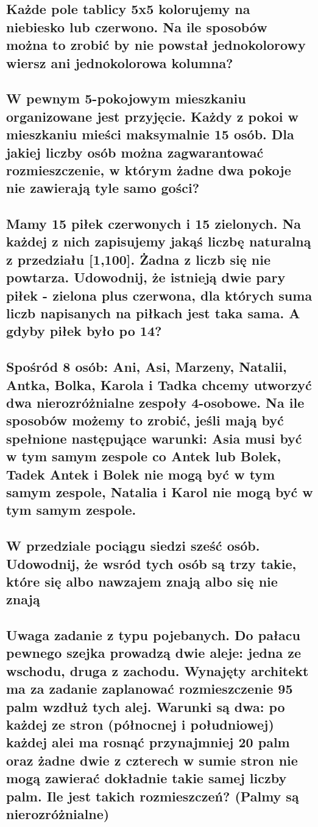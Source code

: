 \documentclass[12pt]{article}
\begin{document}
\subsection{Każde pole tablicy 5x5 kolorujemy na niebiesko lub czerwono. Na ile sposobów można to zrobić by nie powstał jednokolorowy wiersz ani jednokolorowa kolumna?}

\subsection{W pewnym 5-pokojowym mieszkaniu organizowane jest przyjęcie. Każdy z pokoi w mieszkaniu mieści maksymalnie 15 osób. Dla jakiej liczby osób można zagwarantować rozmieszczenie, w którym żadne dwa pokoje nie zawierają tyle samo gości?}

\subsection{Mamy 15 piłek czerwonych i 15 zielonych. Na każdej z nich zapisujemy jakąś liczbę naturalną z przedziału [1,100]. Żadna z liczb się nie powtarza. Udowodnij, że istnieją dwie pary piłek - zielona plus czerwona, dla których suma liczb napisanych na piłkach jest taka sama. A gdyby piłek było po 14?}

\newpage

\subsection{Spośród 8 osób: Ani, Asi, Marzeny, Natalii, Antka, Bolka, Karola i Tadka chcemy utworzyć dwa nierozróżnialne zespoły 4-osobowe. Na ile sposobów możemy to zrobić, jeśli mają być spełnione następujące warunki: Asia musi być w tym samym zespole co Antek lub Bolek, Tadek Antek i Bolek nie mogą być w tym samym zespole, Natalia i Karol nie mogą być w tym samym zespole.}

\subsection{W przedziale pociągu siedzi sześć osób. Udowodnij, że wsród tych osób są trzy takie, które się albo nawzajem znają albo się nie znają}

\subsection{Uwaga zadanie z typu pojebanych. Do pałacu pewnego szejka prowadzą dwie aleje: jedna ze wschodu, druga z zachodu. Wynajęty architekt ma za zadanie zaplanować rozmieszczenie 95 palm wzdłuż tych alej. Warunki są dwa: po każdej ze stron (północnej i południowej) każdej alei ma rosnąć przynajmniej 20 palm oraz żadne dwie z czterech w sumie stron nie mogą zawierać dokładnie takie samej liczby palm. Ile jest takich rozmieszczeń? (Palmy są nierozróżnialne)}
\end{document}
